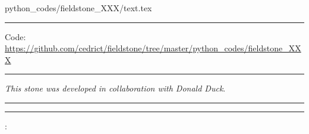 
\begin{flushright} {\tiny {\color{gray} python\_codes/fieldstone\_XXX/text.tex}} \end{flushright}



\par\noindent\rule{\textwidth}{0.4pt}

\begin{center}
\inpython
{\small Code: \url{https://github.com/cedrict/fieldstone/tree/master/python_codes/fieldstone_XXX}}
\end{center}

\par\noindent\rule{\textwidth}{0.4pt}

{\sl This stone was developed in collaboration with Donald Duck}. 

\par\noindent\rule{\textwidth}{0.4pt}



\lipsum[2-4]




\par\noindent\rule{\textwidth}{0.4pt}

\vspace{.5cm}

\begin{center}
\end{center}

\vspace{.5cm}

\Literature:\\


